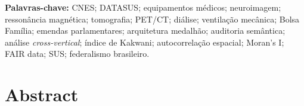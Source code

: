 \documentclass[12pt,a4paper,oneside]{article}
\begin{document}
\begin{singlespace}
\vspace{4pt}
\textbf{Palavras-chave:} CNES; DATASUS; equipamentos médicos;
neuroimagem; ressonância magnética; tomografia; PET/CT; diálise;
ventilação mecânica; Bolsa Família; emendas parlamentares;
arquitetura medalhão; auditoria semântica; análise
\textit{cross-vertical}; índice de Kakwani; autocorrelação espacial;
Moran's I; FAIR data; SUS; federalismo brasileiro.
\end{singlespace}

\section*{Abstract}
\end{document}
